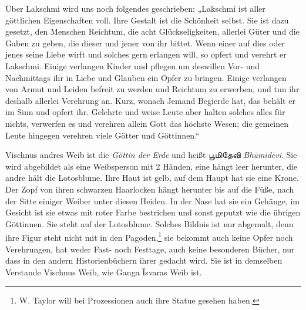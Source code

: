 \documentclass{article}
\newcommand{\TamilText}[1]{\texttamil{#1}}
\newcommand{\tam}[1]{\TamilText{#1}}
\begin{document}
Über Lakschmi wird uns noch folgendes geschrieben: „Lakschmi ist aller göttlichen Eigenschaften voll. Ihre Gestalt ist die Schönheit selbst. Sie ist dazu gesetzt, den Menschen Reichtum, die acht Glückseligkeiten, allerlei Güter und die Gaben zu geben, die dieser und jener von ihr bittet. Wenn einer auf dies oder jenes seine Liebe wirft und solches gern erlangen will, so opfert und verehrt er Lakschmi. Einige verlangen Kinder und pflegen um deswillen Vor- und Nachmittags ihr in Liebe und Glauben ein Opfer zu bringen. Einige verlangen von Armut und Leiden befreit zu werden und Reichtum zu erwerben, und tun ihr deshalb allerlei Verehrung an. Kurz, wonach Jemand Begierde hat, das behält er im Sinn und opfert ihr. Gelehrte und weise Leute aber halten solches alles für nichts, verwerfen es und verehren allein Gott das höchste Wesen; die gemeinen Leute hingegen verehren viele Götter und Göttinnen.“

Vischnus andres Weib ist die \emph{Göttin der Erde} und heißt \tam{பூமிதேவி} \emph{Bh\={u}mid\={e}vi}. Sie wird abgebildet als eine Weibsperson mit 2 Händen, eine hängt leer herunter, die andre hält die Lotosblume. Ihre Haut ist gelb, auf dem Haupt hat sie eine Krone. Der Zopf von ihren schwarzen Haarlocken hängt herunter bis auf die Füße, nach der Sitte einiger Weiber unter diesen Heiden. In der Nase hat sie ein Gehänge, im Gesicht ist sie etwas mit roter Farbe bestrichen und sonst geputzt wie die übrigen Göttinnen. Sie steht auf der Lotosblume. Solches Bildnis ist nur abgemalt, denn ihre Figur steht nicht mit in den Pagoden,\footnote{W. Taylor will bei Prozessionen auch ihre Statue gesehen haben.} sie bekommt auch keine Opfer noch Verehrungen, hat weder Fast- noch Festtage, auch keine besonderen Bücher, nur dass in den andern Historienbüchern ihrer gedacht wird. Sie ist in demselben Verstande Vischnus Weib, wie Ganga \={I}svaras Weib ist.
\end{document}
